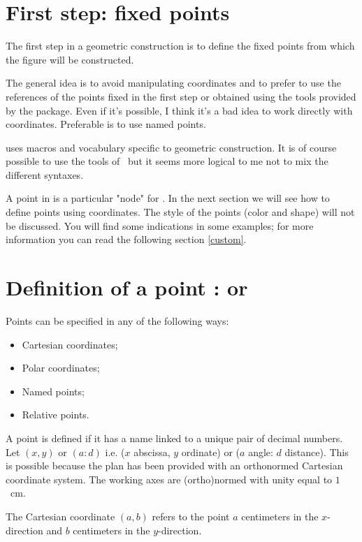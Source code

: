 \section{First step: fixed points}

The first step in a geometric construction is to define the fixed points from which the figure will be constructed.

The general idea is to avoid manipulating coordinates and to prefer to use the references of the points fixed in the first step or obtained using the tools provided by the package. Even if it's possible, I think it's a bad idea to work directly with coordinates. Preferable is to use named points.

\tkzname{\tkznameofpack} uses macros and vocabulary specific to geometric construction. It is of course possible to use the tools of \TIKZ\ but it seems more logical to me not to mix the different syntaxes.

A point in \tkzname{\tkznameofpack} is a particular "node" for \TIKZ. In the next section we will see how to define points using coordinates. The style of the points (color and shape) will not be discussed. You will find some indications in some examples; for more information you can read the following section \ref{custom}.


\section{Definition of a point :  or }

 Points can be specified in any of the following ways:
\begin{itemize}
\item Cartesian coordinates;
\item Polar coordinates;
\item Named points;
\item Relative points.
\end{itemize}


A point is defined if it has a name linked to a unique pair of decimal numbers. 
 Let $(x,y)$ or $(a:d)$  i.e. ($x$ abscissa, $y$ ordinate) or  ($a$ angle: $d$ distance).
 This is possible because the plan has been provided with an orthonormed Cartesian coordinate system.   The working axes are  (ortho)normed with unity equal to $1$~cm.
 
 The Cartesian coordinate $(a,b)$ refers to the
 point $a$ centimeters in the $x$-direction and $b$ centimeters in the
 $y$-direction.

